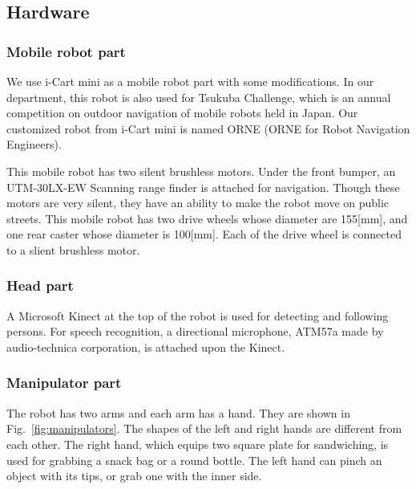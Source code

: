 \documentclass{llncs}
\begin{document}
\subsection{Hardware}
\subsubsection{Mobile robot part}

We use i-Cart mini\cite{icartmini} as a mobile robot part
with some modifications. 
In our department, this robot is also used for Tsukuba Challenge,
which is an annual competition on outdoor navigation of mobile robots
held in Japan.
Our customized robot from i-Cart mini is named ORNE
(ORNE for Robot Navigation Engineers).

This mobile robot has two silent brushless motors.
Under the front bumper, an UTM-30LX-EW Scanning range finder
is attached for navigation.
Though these motors are very silent, 
they have an ability to make the robot move on public streets.
This mobile robot has two drive wheels whose diameter are 155[mm], 
and one rear caster whose diameter is 100[mm].
Each of the drive wheel is connected to a slient brushless motor.


\subsubsection{Head part}

A Microsoft Kinect at the top of the robot is used for
detecting and following persons.
For speech recognition, a directional microphone,
ATM57a made by audio-technica corporation, is attached
upon the Kinect.


\subsubsection{Manipulator part}

The robot has two arms and each arm has a hand.
They are shown in Fig.~\ref{fig:manipulators}.
The shapes of the left and right hands are different from each other.
The right hand, which equips two square plate for sandwiching,
is used for grabbing a snack bag or a round bottle.
The left hand can pinch an object with its tips,
or grab one with the inner side.
\end{document}
